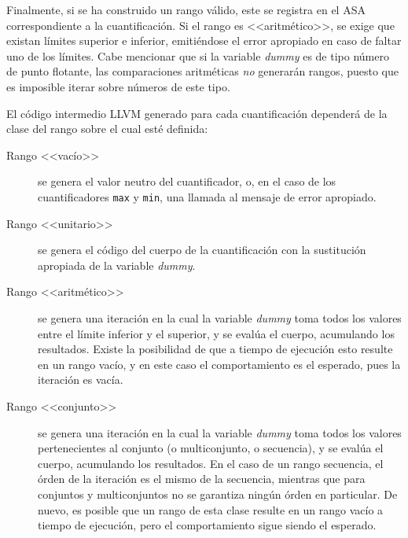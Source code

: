 Finalmente, si se ha construido un rango válido, este se registra en
el ASA correspondiente a la cuantificación. Si el rango es <<aritmético>>, se
exige que existan límites superior e inferior, emitiéndose el error apropiado en
caso de faltar uno de los límites. Cabe mencionar que si la variable
\emph{dummy} es de tipo número de punto flotante, las comparaciones
aritméticas \emph{no} generarán rangos, puesto que es imposible iterar sobre
números de este tipo.

El código intermedio LLVM generado para cada cuantificación dependerá de la
clase del rango sobre el cual esté definida:

\begin{description}

  \item [Rango <<vacío>>] se genera el valor neutro del cuantificador, o, en el
caso de los cuantificadores \texttt{max} y \texttt{min}, una llamada al mensaje
de error apropiado.

  \item [Rango <<unitario>>] se genera el código del cuerpo de la cuantificación
con la sustitución apropiada de la variable \emph{dummy}.

  \item [Rango <<aritmético>>] se genera una iteración en la cual la variable
\emph{dummy} toma todos los valores entre el límite inferior y el superior, y se
evalúa el cuerpo, acumulando los resultados. Existe la posibilidad de que a
tiempo de ejecución esto resulte en un rango vacío, y en este caso el
comportamiento es el esperado, pues la iteración es vacía.

  \item [Rango <<conjunto>>] se genera una iteración en la cual la variable
\emph{dummy} toma todos los valores pertenecientes al conjunto (o multiconjunto,
o secuencia), y se evalúa el cuerpo, acumulando los resultados. En el caso de un
rango secuencia, el órden de la iteración es el mismo de la secuencia, mientras
que para conjuntos y multiconjuntos no se garantiza ningún órden en particular.
De nuevo, es posible que un rango de esta clase resulte en un rango vacío a
tiempo de ejecución, pero el comportamiento sigue siendo el esperado.

\end{description}

